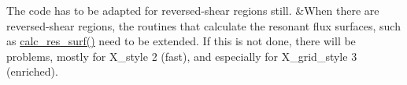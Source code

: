 \begin{longtabu}
The code has to be adapted for reversed-\/shear regions still. &When there are reversed-\/shear regions, the routines that calculate the resonant flux surfaces, such as {\ttfamily \hyperlink{namespacex__ops_a1a90026bbbeddc25e82cfdd304df251f}{calc\+\_\+res\+\_\+surf()}} need to be extended. If this is not done, there will be problems, mostly for {\ttfamily X\+\_\+style} 2 (fast), and especially for {\ttfamily X\+\_\+grid\+\_\+style} 3 (enriched).   \\
\end{longtabu}
